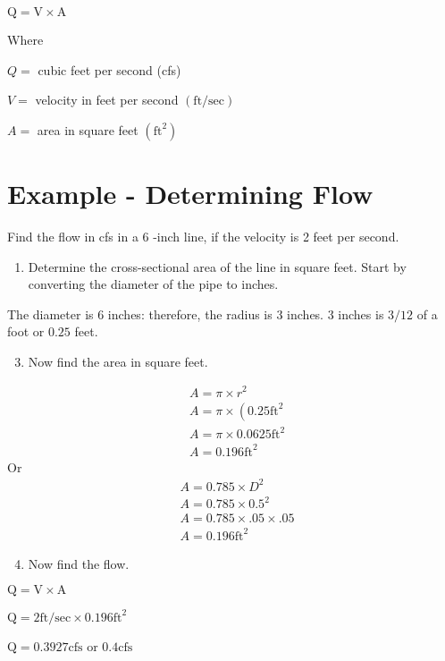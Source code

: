 $\mathrm{Q}=\mathrm{V} \times \mathrm{A}$

Where

$Q=$ cubic feet per second (cfs)

$V=$ velocity in feet per second $(\mathrm{ft} / \mathrm{sec})$

$A=$ area in square feet $\left(\mathrm{ft}^{2}\right)$

\section{Example - Determining Flow}
Find the flow in cfs in a 6 -inch line, if the velocity is 2 feet per second.

\begin{enumerate}
  \item Determine the cross-sectional area of the line in square feet. Start by converting the diameter of the pipe to inches.
\end{enumerate}
The diameter is 6 inches: therefore, the radius is 3 inches. 3 inches is $3 / 12$ of a foot or $0.25$ feet.

\begin{enumerate}
  \setcounter{enumi}{2}
  \item Now find the area in square feet.
\end{enumerate}
$$
\begin{aligned}
&A=\pi \times r^{2} \\
&A=\pi \times\left(0.25 \mathrm{ft}^{2}\right. \\
&A=\pi \times 0.0625 \mathrm{ft}^{2} \\
&A=0.196 \mathrm{ft}^{2}
\end{aligned}
$$
Or
$$
\begin{aligned}
&A=0.785 \times D^{2} \\
&A=0.785 \times 0.5^{2} \\
&A=0.785 \times .05 \times .05 \\
&A=0.196 \mathrm{ft}^{2}
\end{aligned}
$$

\begin{enumerate}
  \setcounter{enumi}{3}
  \item Now find the flow.
\end{enumerate}
$\mathrm{Q}=\mathrm{V} \times \mathrm{A}$

$\mathrm{Q}=2 \mathrm{ft} / \mathrm{sec} \times 0.196 \mathrm{ft}^{2}$

$\mathrm{Q}=0.3927 \mathrm{cfs}$ or $0.4 \mathrm{cfs}$

